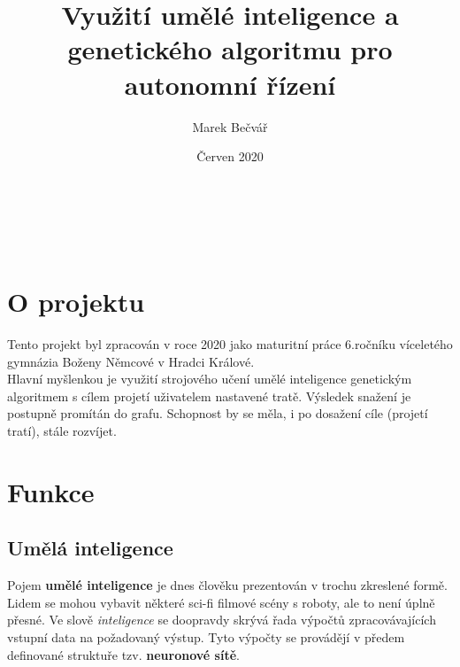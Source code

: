 \documentclass[a4paper,12pt]{article}
\title{Využití umělé inteligence a genetického algoritmu pro autonomní řízení}
\author{Marek Bečvář}
\date{Červen 2020}
\renewcommand{\maketitle}
{
    \begin{center}
        \vspace*{0cm}
        \LARGE{\textbf{\thetitle}}\\
        \vspace{0.5cm}
        \Large{\textbf{\theauthor}}\\
        \vspace{0.5cm}
        \normalsize{\thedate}
        \vspace{0.5cm}
    \end{center}
}
\newcommand{\tab}
{
    \hspace*{1em}
}
\begin{document}
    \maketitle

    \vspace{0.5cm}


    \section{O projektu}
        \tab Tento projekt byl zpracován v roce 2020 jako maturitní práce 6.ročníku 
        víceletého gymnázia Boženy Němcové v Hradci Králové.\\
        \tab Hlavní myšlenkou je využití strojového učení umělé inteligence genetickým 
        algoritmem s cílem projetí uživatelem nastavené tratě. Výsledek snažení 
        je postupně promítán do grafu. Schopnost by se měla, i po dosažení cíle (projetí tratí),
        stále rozvíjet.

    \section{Funkce}
    \subsection{Umělá inteligence}
        Pojem \textbf{umělé inteligence} je dnes člověku prezentován v trochu zkreslené formě.
        Lidem se mohou vybavit některé sci-fi filmové scény s roboty, ale to není úplně přesné.
        Ve slově \textit{inteligence} se doopravdy skrývá řada výpočtů zpracovávajících vstupní data 
        na požadovaný výstup. Tyto výpočty se provádějí v předem definované 
        struktuře tzv. \textbf{neuronové sítě}.\\
            
\end{document}
